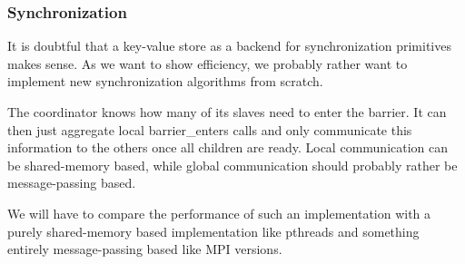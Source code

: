 \documentclass{article}
\begin{document}
\subsubsection{Synchronization}

It is doubtful that a key-value store as a backend for synchronization
primitives makes sense. As we want to show efficiency, we probably
rather want to implement new synchronization algorithms from scratch.

The coordinator knows how many of its slaves need to enter the
barrier. It can then just aggregate local barrier\_enters calls and
only communicate this information to the others once all children are
ready. Local communication can be shared-memory based, while global
communication should probably rather be message-passing based.

We will have to compare the performance of such an implementation with
a purely shared-memory based implementation like pthreads and
something entirely message-passing based like MPI versions.

\newpage



\label{LastPage}
\end{document}
